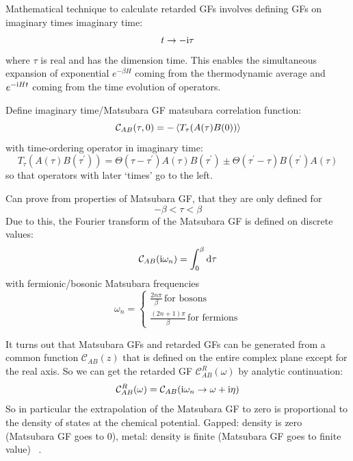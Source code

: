 \documentclass[../notes.tex]{subfiles}
\begin{document}

Mathematical technique to calculate retarded GFs involves defining GFs on imaginary times \gls{imaginary time}:
\begin{equation}
	t \to -\mathrm{i} \tau
\end{equation}
where \(\tau\) is real and has the dimension time.
This enables the simultaneous expansion of exponential \(e^{-\beta H}\) coming from the thermodynamic average and \(e^{-\mathrm{i} H t}\) coming from the time evolution of operators.

Define imaginary time/Matsubara GF \gls{matsubara correlation function}:
\begin{equation}
	\mathcal{C}_{A B} (\tau, 0) = - \Braket{T_{\tau} (A(\tau) B(0))}
\end{equation}
with time-ordering operator in imaginary time:
\begin{equation}
	T_{\tau} (A(\tau) B(\tau^{\prime})) = \Theta(\tau - \tau^{\prime}) A(\tau) B(\tau^{\prime}) \pm \Theta(\tau^{\prime} - \tau) B(\tau^{\prime}) A(\tau)
\end{equation}
so that operators with later `times' go to the left.

Can prove from properties of Matsubara GF, that they are only defined for
\begin{equation}
	-\beta < \tau < \beta
\end{equation}
Due to this, the Fourier transform of the Matsubara GF is defined on discrete values:
\begin{equation}
	\mathcal{C}_{A B} (\iu \omega_n) = \int_{0}^{\beta} \odif{\tau}
\end{equation}
with fermionic/bosonic Matsubara frequencies
\begin{equation}
	\omega_n =
	\begin{cases}
		\frac{2n \pi}{\beta} \, \text{for bosons} \\
		\frac{(2n + 1)\pi}{\beta} \, \text{for fermions}
	\end{cases}
\end{equation}


It turns out that Matsubara GFs and retarded GFs can be generated from a common function \(\mathcal{C}_{AB} (z)\) that is defined on the entire complex plane except for the real axis.
So we can get the retarded GF \(\mathcal{C}_{AB}^R (\omega)\) by analytic continuation:
\begin{equation}
	\mathcal{C}_{AB}^R (\omega) = \mathcal{C}_{AB} (\mathrm{i} \omega_n \to \omega + \mathrm{i} \eta)
\end{equation}
So in particular the extrapolation of the Matsubara GF to zero is proportional to the density of states at the chemical potential.
Gapped: density is zero (Matsubara GF goes to 0), metal: density is finite (Matsubara GF goes to finite value) ~\cite[8.3.4]{bruusManyBodyQuantumTheory2004}.
\end{document}
